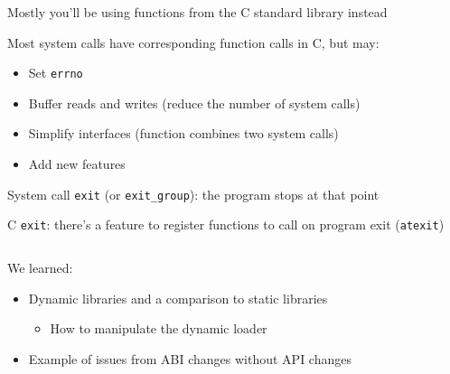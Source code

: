 \begin{slide}
  

  Mostly you'll be using functions from the C standard library instead
  \bigskip

  Most system calls have corresponding function calls in C, but may:
  \begin{itemize}
    \item Set \texttt{errno}
    \item Buffer reads and writes (reduce the number of system calls)
    \item Simplify interfaces (function combines two system calls)
    \item Add new features
  \end{itemize}
\end{slide}

\begin{slide}
  

  System call \texttt{exit} (or \texttt{exit\_group}): the program
  stops at that point
  \medskip

  C \texttt{exit}: there's a feature to register functions to call
  on program exit (\texttt{atexit})
  \medskip

  \inputminted{c}{atexit-example.c}
\end{slide}

\begin{slide}
  

  We learned:
  \begin{itemize}
    \item Dynamic libraries and a comparison to static libraries
    \begin{itemize}
      \item How to manipulate the dynamic loader
    \end{itemize}
    \item Example of issues from ABI changes without API changes
  \end{itemize}

\end{slide}



